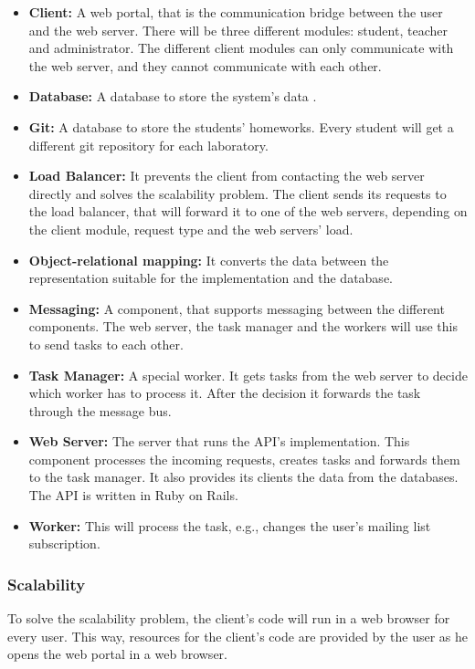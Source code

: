 \begin{itemize}
	\item \textbf{Client:} A web portal, that is the communication bridge between the user and the web server. There will be three different modules: student, teacher and administrator. The different client modules can only communicate with the web server, and they cannot communicate with each other.
	\item \textbf{Database:} A database to store the system's data . 
	\item \textbf{Git:} A database to store the students' homeworks. Every student will get a different git repository for each laboratory.
	\item \textbf{Load Balancer:} It prevents the client from contacting the web server directly and solves the scalability problem. The client sends its requests to the load balancer, that will forward it to one of the web servers, depending on the client module, request type and the web servers' load.
	\item \textbf{Object-relational mapping:} It converts the data between the representation suitable for the implementation and the database. 
	\item \textbf{Messaging:} A component, that supports messaging between the different components. The web server, the task manager and the workers will use this to send tasks to each other.
	\item \textbf{Task Manager:} A special worker. It gets tasks from the web server to decide which worker has to process it. After the decision it forwards the task through the message bus.
	\item \textbf{Web Server:} The server that runs the API's implementation. This component processes the incoming requests, creates tasks and forwards them to the task manager. It also provides its clients the data from the databases. The API is written in Ruby on Rails. 
	\item \textbf{Worker:} This will process the task, e.g., changes the user's mailing list subscription.
\end{itemize}

\subsubsection{Scalability}

To solve the scalability problem, the client's code will run in a web browser for every user. This way, resources for the client's code are provided by the user as he opens the web portal in a web browser.
 

